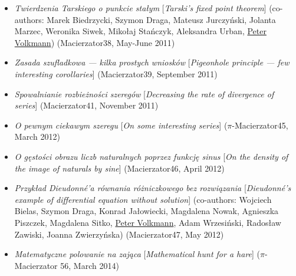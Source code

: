 \begin{itemize}
  \item \textsl{Twierdzenia Tarskiego o punkcie stałym} [\textsl{Tarski's fixed point theorem}] (co-authors: Marek Biedrzycki, Szymon Draga, Mateusz Jurczyński, Jolanta Marzec, Weronika Siwek, Mikołaj Stańczyk, Aleksandra Urban, \href{\urlVolkmann}{Peter Volkmann}) (Macierzator38, May-June 2011)
  \item \textsl{Zasada szufladkowa --- kilka prostych wniosków} [\textsl{Pigeonhole principle --- few interesting corollaries}] (Macierzator39, September 2011)
  \item \textsl{Spowalnianie rozbieżności szeregów} [\textsl{Decreasing the rate of divergence of series}] (Macierzator41, November 2011)
  \item \textsl{O pewnym ciekawym szeregu} [\textsl{On some interesting series}] ($\pi$-Macierzator45, March 2012)
  \item \textsl{O gęstości obrazu liczb naturalnych poprzez funkcję sinus} [\textsl{On the density of the image of naturals by sine}] (Macierzator46, April 2012)
  \item \textsl{Przykład Dieudonné'a równania różniczkowego bez rozwiązania} [\textsl{Dieudonné's example of differential equation without solution}] (co-authors: Wojciech Bielas, Szymon Draga, Konrad Jałowiecki, Magdalena Nowak, Agnieszka Piszczek, Magdalena Sitko, \href{\urlVolkmann}{Peter Volkmann}, Adam Wrzesiński, Radosław Zawiski, Joanna Zwierzyńska) (Macierzator47, May 2012)
  \item \textsl{Matematyczne polowanie na zająca} [\textsl{Mathematical hunt for a hare}] ($\pi$-Macierzator 56, March 2014)
\end{itemize}
